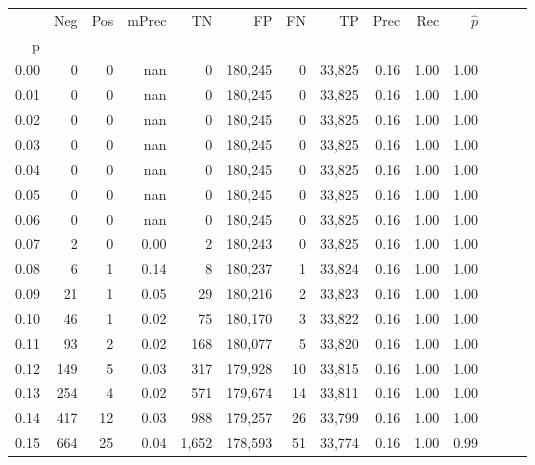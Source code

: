 \begin{tabular}{rrrrrrrrrrrrrr}
\toprule
{} &    Neg &  Pos & mPrec &       TN &       FP &      FN &      TP &  Prec &   Rec & $\hat{p}$ \\
p    &        &      &       &          &          &         &         &       &       &           \\
\midrule
0.00 &      0 &    0 &   nan &        0 &  180,245 &       0 &  33,825 &  0.16 &  1.00 &      1.00 \\
0.01 &      0 &    0 &   nan &        0 &  180,245 &       0 &  33,825 &  0.16 &  1.00 &      1.00 \\
0.02 &      0 &    0 &   nan &        0 &  180,245 &       0 &  33,825 &  0.16 &  1.00 &      1.00 \\
0.03 &      0 &    0 &   nan &        0 &  180,245 &       0 &  33,825 &  0.16 &  1.00 &      1.00 \\
0.04 &      0 &    0 &   nan &        0 &  180,245 &       0 &  33,825 &  0.16 &  1.00 &      1.00 \\
0.05 &      0 &    0 &   nan &        0 &  180,245 &       0 &  33,825 &  0.16 &  1.00 &      1.00 \\
0.06 &      0 &    0 &   nan &        0 &  180,245 &       0 &  33,825 &  0.16 &  1.00 &      1.00 \\
0.07 &      2 &    0 &  0.00 &        2 &  180,243 &       0 &  33,825 &  0.16 &  1.00 &      1.00 \\
0.08 &      6 &    1 &  0.14 &        8 &  180,237 &       1 &  33,824 &  0.16 &  1.00 &      1.00 \\
0.09 &     21 &    1 &  0.05 &       29 &  180,216 &       2 &  33,823 &  0.16 &  1.00 &      1.00 \\
0.10 &     46 &    1 &  0.02 &       75 &  180,170 &       3 &  33,822 &  0.16 &  1.00 &      1.00 \\
0.11 &     93 &    2 &  0.02 &      168 &  180,077 &       5 &  33,820 &  0.16 &  1.00 &      1.00 \\
0.12 &    149 &    5 &  0.03 &      317 &  179,928 &      10 &  33,815 &  0.16 &  1.00 &      1.00 \\
0.13 &    254 &    4 &  0.02 &      571 &  179,674 &      14 &  33,811 &  0.16 &  1.00 &      1.00 \\
0.14 &    417 &   12 &  0.03 &      988 &  179,257 &      26 &  33,799 &  0.16 &  1.00 &      1.00 \\
0.15 &    664 &   25 &  0.04 &    1,652 &  178,593 &      51 &  33,774 &  0.16 &  1.00 &      0.99 \\

\end{tabular}
